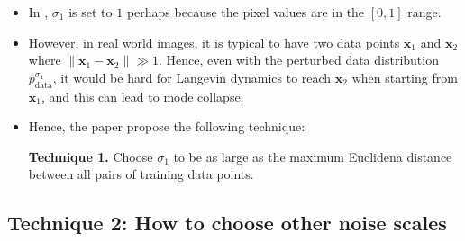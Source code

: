 \documentclass[10pt]{article}
\newcommand{\ve}[1]{\mathbf{#1}}
\newcommand{\mrm}[1]{\mathrm{#1}}
\begin{document}
\begin{itemize}
  \item In \cite{Song:2019}, $\sigma_1$ is set to $1$ perhaps because the pixel values are in the $[0,1]$ range.
  
  \item However, in real world images, it is typical to have two data points $\ve{x}_1$ and $\ve{x}_2$ where $\| \ve{x}_1 - \ve{x}_2 \| \gg 1$. Hence, even with the perturbed data distribution $p_{\mrm{data}}^{\sigma_1}$, it would be hard for Langevin dynamics to reach $\ve{x}_2$ when starting from $\ve{x}_1$, and this can lead to mode collapse.
  
  \item Hence, the paper propose the following technique:
  
  {\bf Technique 1.} Choose $\sigma_1$ to be as large as the maximum Euclidena distance between all pairs of training data points.
\end{itemize}

\subsection{Technique 2: How to choose other noise scales}
\end{document}
